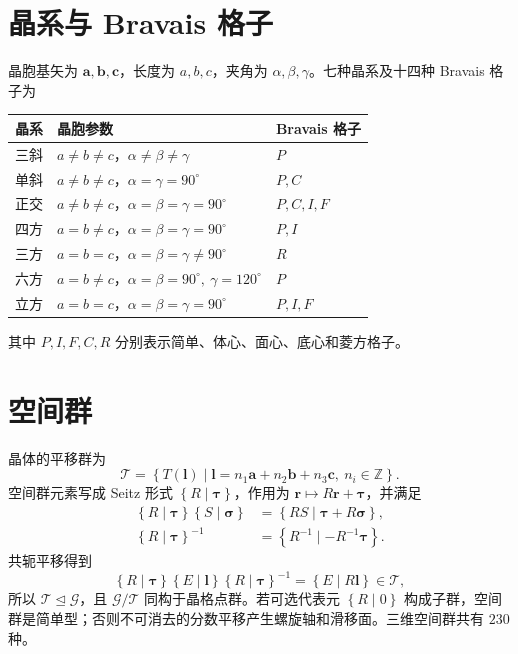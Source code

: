 \section{晶系与 Bravais 格子}
晶胞基矢为 $\bm a,\bm b,\bm c$，长度为 $a,b,c$，夹角为 $\alpha,\beta,\gamma$。七种晶系及十四种 Bravais 格子为
\begin{center}
\begin{tabular}{lll}
\toprule
晶系 & 晶胞参数 & Bravais 格子\\ \midrule
三斜 & $a\ne b\ne c$，$\alpha\ne\beta\ne\gamma$ & $P$\\
单斜 & $a\ne b\ne c$，$\alpha=\gamma=90^\circ$ & $P,C$\\
正交 & $a\ne b\ne c$，$\alpha=\beta=\gamma=90^\circ$ & $P,C,I,F$\\
四方 & $a=b\ne c$，$\alpha=\beta=\gamma=90^\circ$ & $P,I$\\
三方 & $a=b=c$，$\alpha=\beta=\gamma\ne90^\circ$ & $R$\\
六方 & $a=b\ne c$，$\alpha=\beta=90^\circ,\ \gamma=120^\circ$ & $P$\\
立方 & $a=b=c$，$\alpha=\beta=\gamma=90^\circ$ & $P,I,F$\\ \bottomrule
\end{tabular}
\end{center}
其中 $P,I,F,C,R$ 分别表示简单、体心、面心、底心和菱方格子。

\section{空间群}
晶体的平移群为
\begin{equation}
\mathcal T=\left\{T\left(\bm l\right)\mid \bm l=n_1\bm a+n_2\bm b+n_3\bm c,\ n_i\in\mathbb{Z}\right\}.
\end{equation}
空间群元素写成 Seitz 形式 $\left\{R\mid\bm\tau\right\}$，作用为 $\bm r\mapsto R\bm r+\bm\tau$，并满足
\begin{align}
\left\{R\mid\bm\tau\right\}\left\{S\mid\bm\sigma\right\}
&=\left\{RS\mid\bm\tau+R\bm\sigma\right\},\\
\left\{R\mid\bm\tau\right\}^{-1}
&=\left\{R^{-1}\mid-R^{-1}\bm\tau\right\}.
\end{align}
共轭平移得到
\begin{equation}
\left\{R\mid\bm\tau\right\}\left\{E\mid\bm l\right\}
\left\{R\mid\bm\tau\right\}^{-1}=\left\{E\mid R\bm l\right\}\in\mathcal T,
\end{equation}
所以 $\mathcal T\trianglelefteq\mathcal G$，且 $\mathcal G/\mathcal T$ 同构于晶格点群。若可选代表元 $\left\{R\mid0\right\}$ 构成子群，空间群是简单型；否则不可消去的分数平移产生螺旋轴和滑移面。三维空间群共有 $230$ 种。

